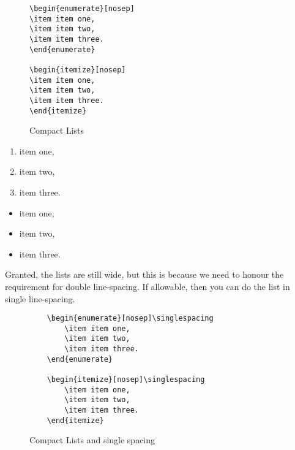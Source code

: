 \begin{figure}[htb!]
\begin{lstlisting}
\begin{enumerate}[nosep]
\item item one,
\item item two,
\item item three.
\end{enumerate}

\begin{itemize}[nosep]
\item item one,
\item item two,
\item item three.
\end{itemize}
\end{lstlisting}
\caption{Compact Lists}\label{fig:enumitem}
\end{figure}


\begin{enumerate}[nosep]
\item item one,
\item item two,
\item item three.
\end{enumerate}

\begin{itemize}[nosep]
\item item one,
\item item two,
\item item three.
\end{itemize}

Granted, the lists are still wide, but this is because we need to honour the requirement for double line-spacing. If allowable, then you can do the list in single line-spacing.

\begin{figure}[htb!]
	\begin{lstlisting}
	\begin{enumerate}[nosep]\singlespacing
		\item item one,
		\item item two,
		\item item three.
	\end{enumerate}
	
	\begin{itemize}[nosep]\singlespacing
		\item item one,
		\item item two,
		\item item three.
	\end{itemize}
	\end{lstlisting}
	\caption{Compact Lists and single spacing}\label{fig:enumitemsinglespacing}
\end{figure}


